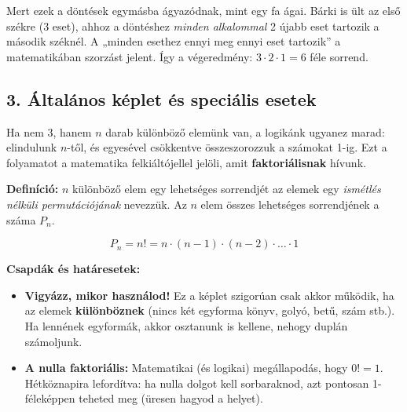 \documentclass[11pt, a4paper]{article}
\begin{document}
Mert ezek a döntések egymásba ágyazódnak, mint egy fa ágai. Bárki is ült az első székre (3 eset), ahhoz a döntéshez \textit{minden alkalommal} 2 újabb eset tartozik a második széknél. A „minden esethez ennyi meg ennyi eset tartozik” a matematikában szorzást jelent. Így a végeredmény: $3 \cdot 2 \cdot 1 = 6$ féle sorrend.

\subsection*{3. Általános képlet és speciális esetek}
Ha nem 3, hanem $n$ darab különböző elemünk van, a logikánk ugyanez marad: elindulunk $n$-től, és egyesével csökkentve összeszorozzuk a számokat 1-ig. Ezt a folyamatot a matematika felkiáltójellel jelöli, amit \textbf{faktoriálisnak} hívunk.

\textbf{Definíció:} $n$ különböző elem egy lehetséges sorrendjét az elemek egy \emph{ismétlés nélküli permutációjának} nevezzük. Az $n$ elem összes lehetséges sorrendjének a száma $P_n$.

$$P_n = n! = n \cdot (n - 1) \cdot (n - 2) \cdot \dots \cdot 1$$

\vspace{0.2cm}
\noindent\textbf{Csapdák és határesetek:}
\begin{itemize}
    \item \textbf{Vigyázz, mikor használod!} Ez a képlet szigorúan csak akkor működik, ha az elemek \textbf{különböznek} (nincs két egyforma könyv, golyó, betű, szám stb.). Ha lennének egyformák, akkor osztanunk is kellene, nehogy duplán számoljunk.
    \item \textbf{A nulla faktoriális:} Matematikai (és logikai) megállapodás, hogy $0! = 1$. Hétköznapira lefordítva: ha nulla dolgot kell sorbaraknod, azt pontosan 1-féleképpen teheted meg (üresen hagyod a helyet).
\end{itemize}

\vspace{0.5cm}
\noindent{}
\vspace{0.5cm}
\end{document}
